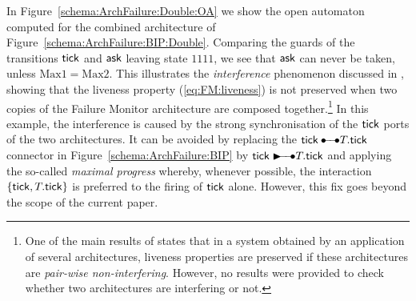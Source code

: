 \documentclass[smallcondensed]{svjour3}
\newcommand{\noteInSB}[2][inline,color=green!40]{\todo[#1]{{\bf Simon: } {#2}}}
\begin{document}
In Figure~\ref{schema:ArchFailure:Double:OA} we show the open
automaton computed for the combined architecture of
Figure~\ref{schema:ArchFailure:BIP:Double}.
%
Comparing the guards of the transitions $\mathsf{tick}$ and $\mathsf{ask}$
leaving state $1111$, we see that $\mathsf{ask}$ can never be taken,
unless $\mathrm{Max1} = \mathrm{Max2}$.  This illustrates the
\emph{interference} phenomenon discussed in
\cite{AttieBBJS16-architectures-faoc}, showing that the liveness
property (\ref{eq:FM:liveness}) is not preserved when two copies of
the Failure Monitor architecture are composed together.\footnote{%
%
  One of the main results of \cite{AttieBBJS16-architectures-faoc}
  states that in a system obtained by an application of several
  architectures, liveness properties are preserved if these
  architectures are \emph{pair-wise non-interfering}.  However, no
  results were provided to check whether two architectures are
  interfering or not.
%
} In this example, the interference is caused by the strong
synchronisation of the $\mathsf{tick}$ ports of the two architectures.  It
can be avoided by replacing the \mbox{$\PortTick
  \bullet\!\!\!-\!\!\!-\!\!\!\bullet \NameTimer.\PortTick$} connector
in Figure~\ref{schema:ArchFailure:BIP} by \mbox{$\PortTick
  \blacktriangleright\!\!\!-\!\!\!-\!\!\!\bullet
  \NameTimer.\PortTick$} and applying the so-called \emph{maximal
  progress} whereby, whenever possible, the interaction $\{\mathsf{tick},
T_{}.\mathsf{tick}\}$ is preferred to the firing of $\mathsf{tick}$
alone.  However, this fix goes beyond the scope of the current paper.


\end{document}
